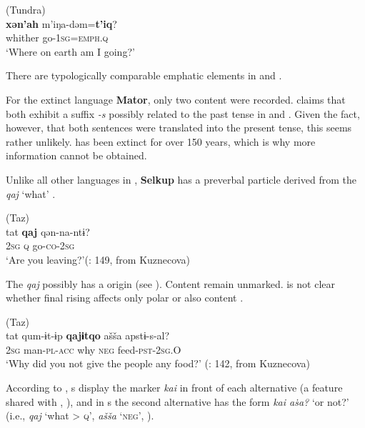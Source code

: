 \ea%
    \label{ex:ural:12}
     (Tundra)\\
    \gll \textbf{{xən}}\textbf{{’}}\textbf{{ah}} m{’iŋa-dəm=}\textbf{{t}}\textbf{{’}}\textbf{{iq}}?\\
    whither  go-1\textsc{sg}=\textsc{emph}.\textsc{q}\\
    \glt ‘Where on earth am I going?’ \citep[123]{Nikolaeva2014}
    \z

\noindent There are typologically comparable emphatic elements in  and  .

For the extinct language \textbf{Mator}, only two content  were recorded. \citet[164]{Helimski1997} claims that both exhibit a suffix \textit{-s} possibly related to the past tense  in  and . Given the fact, however, that both sentences were translated into the present tense, this seems rather unlikely.  has been extinct for over 150 years, which is why more information cannot be obtained.

Unlike all other languages in , \textbf{Selkup} has a preverbal  particle derived from the  \textit{qaj} ‘what’ \citep[18]{Miestamo2011}.

\ea%
    \label{ex:ural:13}
     (Taz)\\
    \gll tat \textbf{{qaj}} qən-na-ntɨ?\\
    2\textsc{sg}  \textsc{q}  go-\textsc{co}-2\textsc{sg}\\
    \glt ‘Are you leaving?’(\citealt{Wagner-Nagy2015}: 149, from Kuznecova)
    \z

\noindent The  \textit{qaj} possibly has a  origin (see ). Content  remain unmarked. \citet[142]{Wagner-Nagy2015} is not clear whether final rising  affects only polar or also content .

\ea%
    \label{ex:ural:14}
     (Taz)\\
    \gll tat  qum-ɨt-ɨp \textbf{{qajɨtqo}} ašša  apstɨ-s-al?\\
    2\textsc{sg}  man-\textsc{pl}-\textsc{acc}  why    \textsc{neg}  feed-\textsc{pst}-2\textsc{sg}.O\\
    \glt ‘Why did you not give the people any food?’ (\citealt{Wagner-Nagy2015}: 142, from Kuznecova)
    \z

\noindent According to \cite[111]{Castrén1855}, s display the marker \textit{kai} in front of each alternative (a feature shared with , ), and in s the second alternative has the form \textit{kai aṡa?} ‘or not?’ (i.e., \textit{qaj} ‘what > \textsc{q}’, \textit{ašša} ‘\textsc{neg}’, \citealt{Wagner-Nagy2015}).

